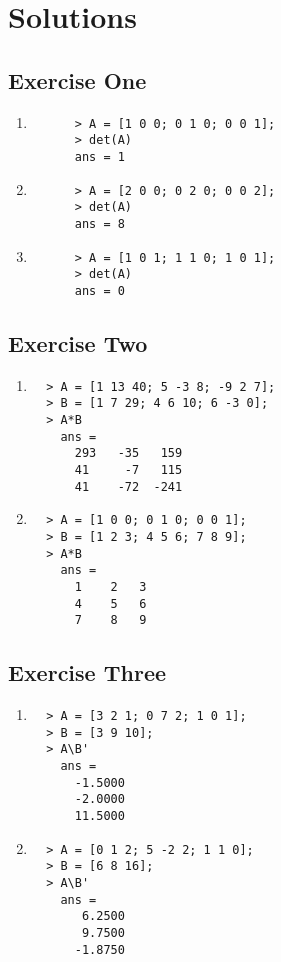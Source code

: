 \documentclass{article}
\begin{document}
\section{Solutions}
\subsection{Exercise One}
\begin{enumerate}
  \item 
    \begin{verbatim}
      > A = [1 0 0; 0 1 0; 0 0 1];
      > det(A)
      ans = 1
    \end{verbatim}
  \item
    \begin{verbatim}
      > A = [2 0 0; 0 2 0; 0 0 2];
      > det(A)
      ans = 8
    \end{verbatim}
  \item
    \begin{verbatim}
      > A = [1 0 1; 1 1 0; 1 0 1];
      > det(A)
      ans = 0
    \end{verbatim}
\end{enumerate}
\subsection{Exercise Two}

\begin{enumerate}
  \item
  \begin{verbatim}
  > A = [1 13 40; 5 -3 8; -9 2 7];
  > B = [1 7 29; 4 6 10; 6 -3 0];
  > A*B
    ans =    
      293   -35   159
      41     -7   115
      41    -72  -241
  \end{verbatim}
  \item
      \begin{verbatim}
  > A = [1 0 0; 0 1 0; 0 0 1];
  > B = [1 2 3; 4 5 6; 7 8 9];
  > A*B
    ans =    
      1    2   3
      4    5   6
      7    8   9
  \end{verbatim}
\end{enumerate}
\subsection{Exercise Three}
 \begin{enumerate}
   \item
     \begin{verbatim}
  > A = [3 2 1; 0 7 2; 1 0 1];
  > B = [3 9 10];
  > A\B'
    ans =
      -1.5000
      -2.0000
      11.5000
     \end{verbatim}
  \item
     \begin{verbatim}
  > A = [0 1 2; 5 -2 2; 1 1 0];
  > B = [6 8 16];
  > A\B'
    ans =
       6.2500
       9.7500
      -1.8750
     \end{verbatim}
 \end{enumerate}
  
\end{document}
